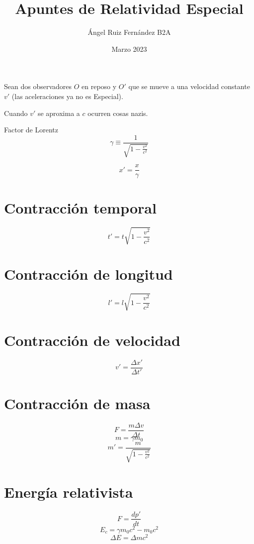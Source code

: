 \documentclass[12pt, letterpaper, twoside]{article}
\title{Apuntes de Relatividad Especial}
\author{Ángel Ruiz Fernández B2A}
\date{Marzo 2023}
\begin{document}
	\maketitle
	
	Sean dos observadores $O$ en reposo y $O'$ que se mueve a una velocidad constante $v'$ (las aceleraciones ya no es Especial).
	
	Cuando $v'$ se aproxima a $c$ ocurren cosas nazis.
	
	Factor de Lorentz
	\begin{equation}
		\gamma \equiv \frac{1}{\sqrt{1 - \frac{v^2}{c^2}}}
	\end{equation}

	\begin{equation}
		x' = \frac{x}{\gamma}
	\end{equation}
	
	\section{Contracción temporal}
	\begin{equation}
		t ' = t \sqrt{1 - \frac{v^2}{c^2}}
	\end{equation}

	\section{Contracción de longitud}
	\begin{equation}
		l ' = l \sqrt{1 - \frac{v^2}{c^2}}
	\end{equation}

	\section{Contracción de velocidad}
	\begin{equation}
		v ' = \frac{\Delta x'}{\Delta t'}
	\end{equation}

	\section{Contracción de masa}
	\begin{equation}
		F = \frac{m\Delta v}{\Delta t}
	\end{equation}
	\begin{equation}
		m = \gamma m_0
	\end{equation}
	\begin{equation}
		m' = \frac{m}{\sqrt{1 - \frac{v^2}{c^2}}}
	\end{equation}

	\section{Energía relativista}
	\begin{equation}
		F = \frac{dp'}{dt}
	\end{equation}
	\begin{equation}
		E_c = \gamma m_0 c^2 - m_0 c^2
	\end{equation}
	\begin{equation}
		\Delta E = \Delta m c^2
	\end{equation}
	
	
\end{document}
